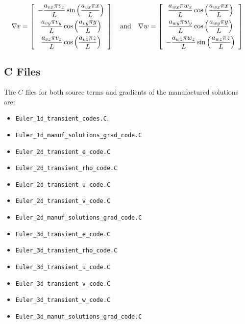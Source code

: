 \documentclass[10pt]{article}
\begin{document}
\begin{equation*}
\nabla  v= \left[ \begin{array}{c}
-  \dfrac{  a_{vx}  \pi v_x}{L}  \sin\left( \dfrac{ a_{vx}  \pi  x}{L}\right)\vspace{5pt}\\
    \dfrac{  a_{vy}  \pi v_y}{L} \cos\left( \dfrac{ a_{vy}  \pi  y}{L}\right)\vspace{5pt}\\
   \dfrac{  a_{vz}  \pi v_z }{L} \cos\left( \dfrac{ a_{vz}  \pi  z}{L}\right)
\end{array} \right]
\quad\mbox{and}\quad
\nabla w = \left[ \begin{array}{c}
\dfrac{  a_{wx}  \pi  w_x}{L} \cos\left( \dfrac{ a_{wx}  \pi  x}{L}\right)\vspace{5pt}\\
  \dfrac{  a_{wy}  \pi w_y}{L}  \cos\left( \dfrac{ a_{wy}  \pi  y}{L}\right)\vspace{5pt} \\
 - \dfrac{  a_{wz}  \pi w_z}{L}  \sin\left( \dfrac{ a_{wz}  \pi  z}{L}\right)
\end{array} \right]
\end{equation*}


\subsection{C Files}
The $C$ files for both source terms and gradients of the  manufactured solutions are:
\begin{itemize}
 \item \texttt{Euler\_1d\_transient\_codes.C},
 \item \texttt{Euler\_1d\_manuf\_solutions\_grad\_code.C}
 \item \texttt{Euler\_2d\_transient\_e\_code.C}
 \item \texttt{Euler\_2d\_transient\_rho\_code.C}
 \item \texttt{Euler\_2d\_transient\_u\_code.C}
 \item \texttt{Euler\_2d\_transient\_v\_code.C}
 \item \texttt{Euler\_2d\_manuf\_solutions\_grad\_code.C}
 \item \texttt{Euler\_3d\_transient\_e\_code.C}
 \item \texttt{Euler\_3d\_transient\_rho\_code.C}
 \item \texttt{Euler\_3d\_transient\_u\_code.C}
 \item \texttt{Euler\_3d\_transient\_v\_code.C}
 \item \texttt{Euler\_3d\_transient\_w\_code.C}
 \item \texttt{Euler\_3d\_manuf\_solutions\_grad\_code.C}
\end{itemize}
\end{document}
